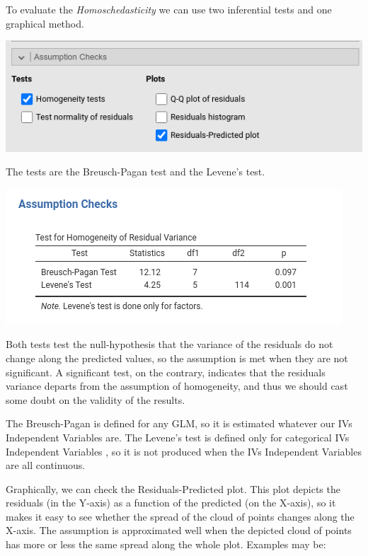 \documentclass[
]{book}
\begin{document}
To evaluate the \emph{Homoschedasticity} we can use two inferential tests and one graphical method.

\includegraphics{bookletpics/2_assumptions_input1.png}

The tests are the Breusch-Pagan test and the Levene's test.

\includegraphics{bookletpics/2_assumptions_output1.png}

Both tests test the null-hypothesis that the variance of the residuals do not change along the predicted values, so the assumption is met when they are not significant. A significant test, on the contrary, indicates that the residuals variance departs from the assumption of homogeneity, and thus we should cast some doubt on the validity of the results.

The Breusch-Pagan is defined for any GLM, so it is estimated whatever our {IVs {Independent Variables} } are. The Levene's test is defined only for categorical {IVs {Independent Variables} }, so it is not produced when the {IVs {Independent Variables} } are all continuous.

Graphically, we can check the {Residuals-Predicted plot}. This plot depicts the residuals (in the Y-axis) as a function of the predicted (on the X-axis), so it makes it easy to see whether the spread of the cloud of points changes along the X-axis. The assumption is approximated well when the depicted cloud of points has more or less the same spread along the whole plot. Examples may be:
\end{document}
